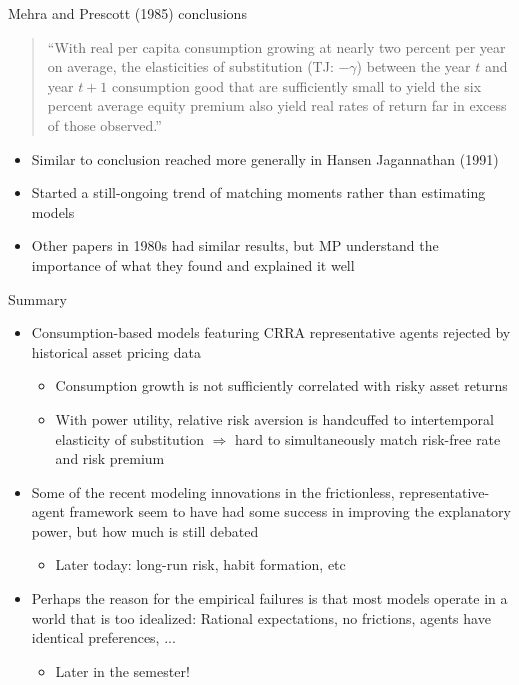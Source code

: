 \documentclass[xcolor=table, aspectratio=169]{beamer}
\begin{document}
\begin{frame}{Mehra and Prescott (1985) conclusions}
\begin{quote}
``With real per capita consumption growing at nearly two percent per year on average, the elasticities of substitution (TJ: $-\gamma$) between the year $t$ and year $t+1$ consumption good that are sufficiently small to yield the six percent average equity premium also yield real rates of return far in excess of those observed.''
\end{quote}
\vskip 12pt
\begin{itemize}
\item Similar to conclusion reached more generally in Hansen Jagannathan (1991)
\item Started a still-ongoing trend of matching moments rather than estimating models
\item Other papers in 1980s had similar results, but MP understand the importance of what they found and explained it well
\end{itemize}
\end{frame}


\begin{frame}{Summary}
\begin{itemize}
\item Consumption-based models featuring CRRA representative agents rejected by historical asset pricing data
\begin{itemize}
    \item Consumption growth is not sufficiently correlated with risky asset returns
\item With power utility, relative risk aversion is handcuffed to intertemporal elasticity of substitution $\Rightarrow$ hard to simultaneously match risk-free rate and risk premium
\end{itemize}

\item Some of the recent modeling innovations in the frictionless, representative-agent framework seem to have had some success in improving the explanatory power, but how much is still debated
\begin{itemize}
    \item Later today: long-run risk, habit formation, etc
\end{itemize}

\item Perhaps the reason for the empirical failures is that most models operate in a world that is too idealized: Rational expectations, no frictions, agents have identical preferences, ...

\begin{itemize}
    \item Later in the semester!
\end{itemize}

\end{itemize}

\end{frame}
\end{document}
